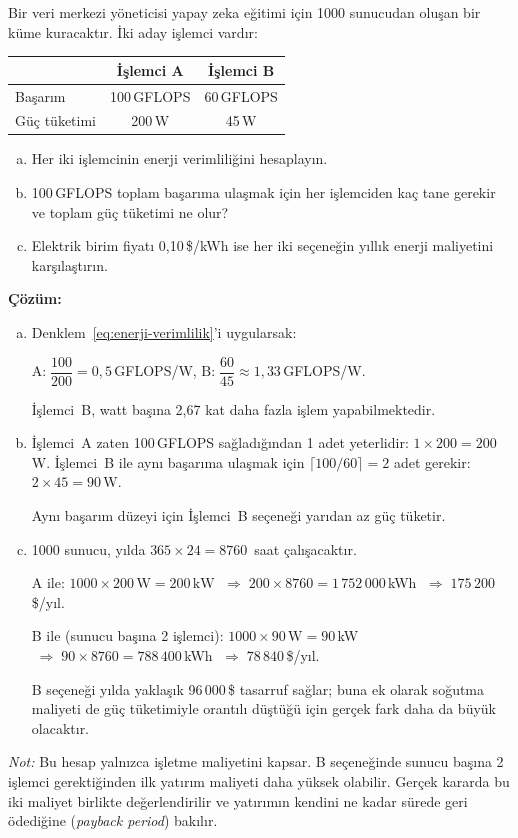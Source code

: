 \begin{ornek}[2.13]
Bir veri merkezi yöneticisi yapay zeka eğitimi için 1000 sunucudan oluşan bir küme kuracaktır. İki aday işlemci vardır:

\begin{center}
\begin{tabular}{lcc}
\toprule
& \textbf{İşlemci A} & \textbf{İşlemci B} \\
\midrule
Başarım & 100\,GFLOPS & 60\,GFLOPS \\
Güç tüketimi & 200\,W & 45\,W \\
\bottomrule
\end{tabular}
\end{center}

\begin{enumerate}[(a)]
    \item Her iki işlemcinin enerji verimliliğini hesaplayın.
    \item 100\,GFLOPS toplam başarıma ulaşmak için her işlemciden kaç tane gerekir ve toplam güç tüketimi ne olur?
    \item Elektrik birim fiyatı 0,10\,\$/kWh ise her iki seçeneğin yıllık enerji maliyetini karşılaştırın.
\end{enumerate}

\textbf{Çözüm:}
\begin{enumerate}[(a)]
    \item Denklem~\ref{eq:enerji-verimlilik}'i uygularsak:

    $\text{A:}\;\dfrac{100}{200} = 0{,}5$\,GFLOPS/W, \qquad $\text{B:}\;\dfrac{60}{45} \approx 1{,}33$\,GFLOPS/W.

    İşlemci~B, watt başına 2,67 kat daha fazla işlem yapabilmektedir.

    \item İşlemci~A zaten 100\,GFLOPS sağladığından 1 adet yeterlidir: $1 \times 200 = 200$\,W. İşlemci~B ile aynı başarıma ulaşmak için $\lceil 100/60 \rceil = 2$ adet gerekir: $2 \times 45 = 90$\,W.

    Aynı başarım düzeyi için İşlemci~B seçeneği yarıdan az güç tüketir.

    \item 1000 sunucu, yılda $365 \times 24 = 8760$~saat çalışacaktır.

    A ile: $1000 \times 200\,\text{W} = 200\,\text{kW}$ $\;\Rightarrow\; 200 \times 8760 = 1\,752\,000$\,kWh $\;\Rightarrow\; 175\,200$\,\$/yıl.

    B ile (sunucu başına 2 işlemci): $1000 \times 90\,\text{W} = 90$\,kW $\;\Rightarrow\; 90 \times 8760 = 788\,400$\,kWh $\;\Rightarrow\; 78\,840$\,\$/yıl.

    B seçeneği yılda yaklaşık 96\,000\,\$ tasarruf sağlar; buna ek olarak soğutma maliyeti de güç tüketimiyle orantılı düştüğü için gerçek fark daha da büyük olacaktır.
\end{enumerate}

\noindent\emph{Not:} Bu hesap yalnızca işletme maliyetini kapsar. B seçeneğinde sunucu başına 2 işlemci gerektiğinden ilk yatırım maliyeti daha yüksek olabilir. Gerçek kararda bu iki maliyet birlikte değerlendirilir ve yatırımın kendini ne kadar sürede geri ödediğine (\emph{payback period}) bakılır.
\end{ornek}

